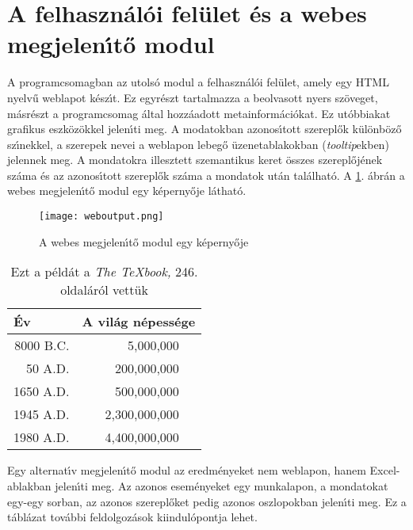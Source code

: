 \documentclass{llncs}
\begin{document}
\section{A felhaszn\'al\'oi fel\"ulet \'es a webes megjelen\'\i t\H{o} modul}

A programcsomagban az utols\'o modul a felhaszn\'al\'oi fel\"ulet, amely
egy HTML nyelv\H{u} weblapot k\'esz\'\i t. Ez egyr\'eszt tartalmazza
a beolvasott nyers sz\"oveget, m\'asr\'eszt a programcsomag \'altal hozz\'aadott
metainform\'aci\'okat. Ez ut\'obbiakat grafikus eszk\"oz\"okkel jelen\'\i ti meg.
A modatokban azonos\'\i  tott szerepl\H{o}k k\"ul\"onb\"oz\H{o} sz\'\i nekkel,
a szerepek nevei a weblapon lebeg\H{o} \"uzenetablakokban ({\em tooltip}ekben) jelennek
meg. A mondatokra illesztett szemantikus keret \"osszes szerepl\H{o}j\'enek
sz\'ama \'es az azonos\'\i tott szerepl\H{o}k sz\'ama a mondatok ut\'an
tal\'alhat\'o. A \ref{fig:weboutput}. \'abr\'an a webes megjelen\'\i t\H{o} modul
egy k\'eperny\H{o}je l\'athat\'o.

\begin{figure}
	\begin{center}
		\texttt{[image: weboutput.png]}
	\end{center}
  \vspace{-3mm}
	\caption{A webes megjelen\'\i t\H{o} modul egy k\'eperny\H{o}je}
  \vspace{-4mm}
	\label{fig:weboutput}
\end{figure}

\begin{table}
\caption{Ezt a p\'eld\'at a {\it The \TeX{}book,} 246. oldal\'ar\'ol vett\"uk}
\vspace{2pt}
\begin{tabular}{r@{\quad}rl}
\hline
\multicolumn{1}{l}{\rule{0pt}{12pt}
  \'Ev}&\multicolumn{2}{l}{A vil\'ag n\'epess\'ege}\\[2pt]
\hline\rule{0pt}{12pt}
8000 B.C.  &     5,000,000& \\
  50 A.D.  &   200,000,000& \\
1650 A.D.  &   500,000,000& \\
1945 A.D.  & 2,300,000,000& \\
1980 A.D.  & 4,400,000,000& \\[2pt]
\hline
\end{tabular}
\end{table}

Egy alternat\'\i v megjelen\'\i t\H{o} modul az eredm\'enyeket nem
weblapon, hanem Excel-ablakban jelen\'\i ti meg. Az azonos esem\'enyeket
egy munkalapon, a mondatokat egy-egy sorban, az azonos szerepl\H{o}ket pedig
azonos oszlopokban jelen\'\i ti meg. Ez a t\'abl\'azat tov\'abbi
feldolgoz\'asok kiindul\'opontja lehet.
\end{document}
